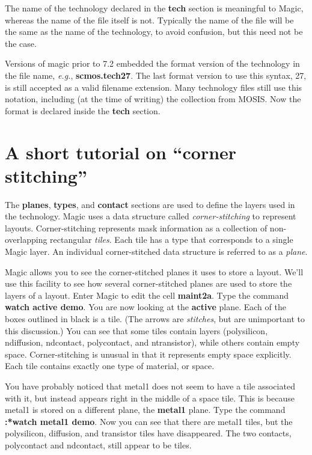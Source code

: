 \documentclass[letterpaper,twoside,12pt]{article}
\begin{document}
The name of the technology declared in the {\bfseries tech}
section is meaningful to Magic, whereas the name of the file
itself is not.  Typically the name of the file will be the
same as the name of the technology, to avoid confusion, but
this need not be the case.

Versions of magic prior to 7.2 embedded the format version
of the technology in the file name, {\itshape e.g.},
{\bfseries scmos.tech27}.  The last format version to use
this syntax, 27, is still accepted as a valid filename
extension.  Many technology files still use this notation,
including (at the time of writing) the collection from MOSIS.
Now the format is declared inside the {\bfseries tech}
section.

\section{A short tutorial on ``corner stitching''}

The {\bfseries planes}, {\bfseries types}, and {\bfseries contact} sections
are used to define the layers used in the technology.
Magic uses a data structure called {\itshape corner-stitching} to represent
layouts.  Corner-stitching represents mask information
as a collection of non-overlapping rectangular {\itshape tiles}.
Each tile has a type that corresponds to a single Magic layer.
An individual corner-stitched data structure is referred to as a {\itshape plane}.

Magic allows you to see the corner-stitched planes it uses to store a layout.
We'll use this facility to see how several corner-stitched planes
are used to store the layers of a layout.
Enter Magic to edit the cell {\bfseries maint2a}.
Type the command {\bfseries *watch active demo}.
You are now looking at the {\bfseries active} plane.
Each of the boxes outlined in black is a tile.
(The arrows are {\itshape stitches}, but are unimportant to this discussion.)
You can see that some tiles contain layers
(polysilicon, ndiffusion, ndcontact, polycontact, and ntransistor),
while others contain empty space.
Corner-stitching is unusual in that it represents empty space explicitly.
Each tile contains exactly one type of material, or space.

You have probably noticed that metal1 does not seem to have
a tile associated with it, but instead appears right in the middle
of a space tile.
This is because metal1 is stored on a different plane, the {\bfseries metal1} plane.
Type the command {\bfseries :*watch metal1 demo}.
Now you can see that there are metal1 tiles,
but the polysilicon, diffusion, and transistor tiles have disappeared.
The two contacts, polycontact and ndcontact, still appear to be tiles.
\end{document}
